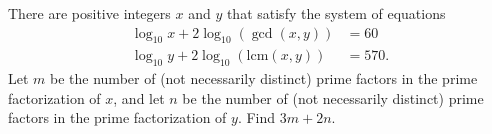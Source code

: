 There are positive integers $x$ and $y$ that satisfy the system of equations
\begin{align*}
\log_{10} x + 2 \log_{10} (\gcd(x,y)) &= 60 \\ \log_{10} y + 2 \log_{10} (\text{lcm}(x,y)) &= 570.
\end{align*}Let $m$ be the number of (not necessarily distinct) prime factors in the prime factorization of $x$, and let $n$ be the number of (not necessarily distinct) prime factors in the prime factorization of $y$. Find $3m+2n$.